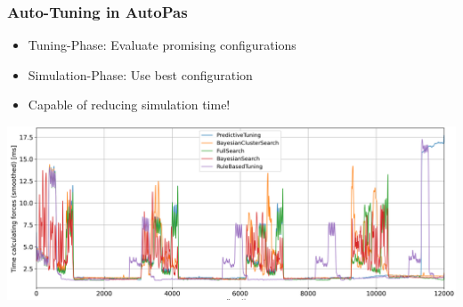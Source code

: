 \documentclass[
	10pt,
	t		%
]{beamer}
\begin{document}
\begin{frame}
    \frametitle{Auto-Tuning in AutoPas}

    \begin{itemize}
        \item Tuning-Phase: Evaluate promising configurations
        \item Simulation-Phase: Use best configuration
        \item Capable of reducing simulation time!
    \end{itemize}

    \vspace{0.2cm}

    \begin{center}
        \includegraphics[width=1\textwidth]{figures/timing.png}
    \end{center}
\end{frame}



\end{document}
